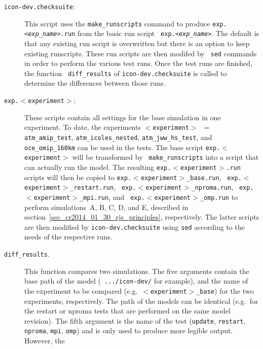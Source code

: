 \begin{description}
\item[{\tt icon-dev.checksuite}:]\begin{sloppypar} 
  This script uses the {\tt make\_runscripts} command to produce
  {\tt exp.<{\it exp\_name}>.run} from the basic run script {\tt
    exp.<{\it exp\_name}>}. The default is that any existing run script
  is overwritten but there is an option to keep existing
  runscripts. These run scripts  
  are then modifed by {\tt 
    sed} commands in order to perform the various test runs. Once the
  test runs are finished, the function {\tt 
    diff\_results} of {\tt icon-dev.checksuite} is called to
  determine the differences 
  between those runs.
  \end{sloppypar}
\item[{\tt exp.$<$experiment$>$}:] \begin{sloppypar} 
  These scripts contain all
  settings for the base simulation in one experiment. To date, the
  experiments {\tt $<$experiment$>$ $=$ atm\_amip\_test}, 
  {\tt atm\_icoles\_nested}, {\tt atm\_jww\_hs\_test}, and  {\tt
    oce\_omip\_160km} can be used in 
  the tests. The 
  base script {\tt exp.$<$experiment$>$}
  will be 
  transformed by {\tt 
    make\_runscripts} into a script that can actually run the \icon{}
  model. The resulting {\tt exp.$<$experiment$>$.run} scripts will then
  be copied to {\tt exp.$<$experiment$>$\_base.run}, {\tt
    exp.$<$experiment$>$\_restart.run}, {\tt
    exp.$<$experiment$>$\_nproma.run}, {\tt
    exp.$<$experiment$>$\_mpi.run}, and {\tt
    exp.$<$experiment$>$\_omp.run} 
  to perform simulations~A, B, C, D, and E, described in
  section~\ref{sec_cr2014_01_30_rjs_principles}, respectively. The
  latter scripts 
  are then modified by {\tt icon-dev.checksuite} using {\tt sed}
  according to the needs of the respective runs.
  \end{sloppypar}
\item[{\tt diff\_results}.] \begin{sloppypar} This function compares two
  simulations. The five arguments contain the base path of the model ({\tt
    .../icon-dev/} for example), and the name of the experiment to be compared
  (e.g.~{\tt $<$experiment$>$\_base}) for the two experiments,
  respectively. The path of
  the models can be identical (e.g.~for the restart or nproma tests
  that are performed on the same model revision). The fifth argument
  is the name of the test ({\tt update}, {\tt restart}, {\tt nproma},
  {\tt mpi}, {\tt omp})
  and is only used to produce more legible output. However, the {\tt
}
\end{sloppypar}
\end{description}
